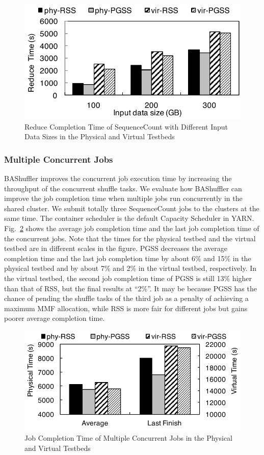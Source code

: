 \documentclass[10pt,journal,compsoc]{IEEEtran}
\begin{document}
\begin{figure}[!t]
\centering
\includegraphics[width=0.8\columnwidth,height=0.4\columnwidth]{figure11}
\caption{Reduce Completion Time of SequenceCount with Different Input Data Sizes in the Physical and Virtual Testbeds}
\label{fig:r_sizes}
\end{figure}



\subsubsection{Multiple Concurrent Jobs}
BAShuffler improves the concurrent job execution time by increasing
the throughput of the concurrent shuffle tasks.
We evaluate how BAShuffler can improve the job completion time when
multiple jobs run concurrently in the shared cluster.
We submit totally three SequenceCount jobs to the clusters at the same time.
The container scheduler is the default Capacity Scheduler in YARN. 
Fig.~\ref{fig:r_concurrent} shows the average job completion time and
the last job completion time of the concurrent jobs.
Note that the times for the physical testbed and the virtual testbed
are in different scales in the figure.
PGSS decreases the average completion time and the last job
completion time by about 6\% and 15\% in the physical testbed 
and by about 7\% and 2\% in the virtual testbed, respectively. 
In the virtual testbed, the second job completion time of PGSS is still 13\% higher than that of RSS, but the final results at ``2\%''.
It may be because PGSS has the chance of pending the shuffle tasks of the third job as a penalty of achieving a maximum MMF allocation, 
while RSS is more fair for different jobs but gains poorer average completion time. 


\begin{figure}[!t]
\centering
\includegraphics[width=0.9\columnwidth,height=0.4\columnwidth]{figure12}
\caption{Job Completion Time of Multiple Concurrent Jobs in the Physical and Virtual Testbeds}
\label{fig:r_concurrent}
\end{figure}
\end{document}
